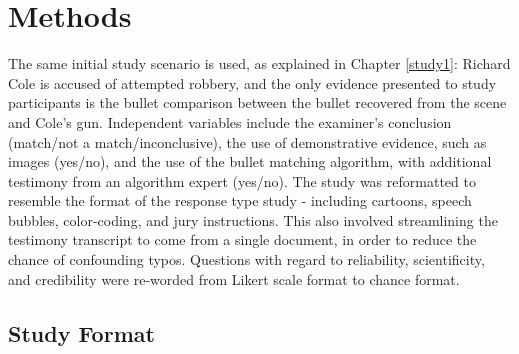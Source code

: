 \documentclass[print]{nuthesis}
\begin{document}
\hypertarget{methods-2}{%
\section{Methods}\label{methods-2}}

The same initial study scenario is used, as explained in Chapter \ref{study1}: Richard Cole is accused of attempted robbery, and the only evidence presented to study participants is the bullet comparison between the bullet recovered from the scene and Cole's gun.
Independent variables include the examiner's conclusion (match/not a match/inconclusive), the use of demonstrative evidence, such as images (yes/no), and the use of the bullet matching algorithm, with additional testimony from an algorithm expert (yes/no).
The study was reformatted to resemble the format of the response type study - including cartoons, speech bubbles, color-coding, and jury instructions.
This also involved streamlining the testimony transcript to come from a single document, in order to reduce the chance of confounding typos.
Questions with regard to reliability, scientificity, and credibility were re-worded from Likert scale format to chance format.

\hypertarget{study-format-2}{%
\subsection{Study Format}\label{study-format-2}}
\end{document}
